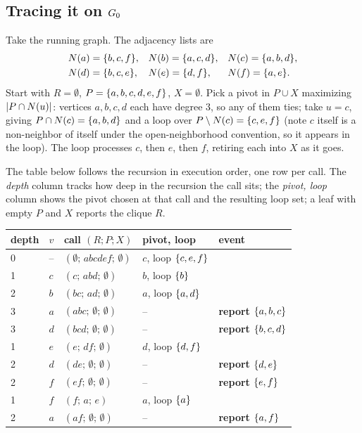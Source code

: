 \subsection{Tracing it on $G_0$}
\label{ch29:bk-trace}

Take the running graph. The adjacency lists are
\[
\begin{aligned}
&N(a)=\{b,c,f\}, &&N(b)=\{a,c,d\}, &&N(c)=\{a,b,d\},\\
&N(d)=\{b,c,e\}, &&N(e)=\{d,f\},   &&N(f)=\{a,e\}.
\end{aligned}
\]
Start with $R=\emptyset$, $P=\{a,b,c,d,e,f\}$, $X=\emptyset$. Pick a pivot in
$P\cup X$ maximizing $\lvert P\cap N(u)\rvert$: vertices $a,b,c,d$ each have degree $3$,
so any of them ties; take $u=c$, giving $P\cap N(c)=\{a,b,d\}$ and a loop over
$P\setminus N(c)=\{c,e,f\}$ (note $c$ itself is a non-neighbor of itself under
the open-neighborhood convention, so it appears in the loop). The loop processes
$c$, then $e$, then $f$, retiring each into $X$ as it goes.

The table below follows the recursion in execution order, one row per call. The
\emph{depth} column tracks how deep in the recursion the call sits; the
\emph{pivot, loop} column shows the pivot chosen at that call and the resulting
loop set; a leaf with empty $P$ and $X$ reports the clique $R$.

\begin{center}
\renewcommand{\arraystretch}{1.25}
\begin{tabular}{@{}lllll@{}}
\toprule
depth & $v$ & call $(R;P;X)$ & pivot, loop & event \\
\midrule
0 & --   & $(\emptyset;\,abcdef;\,\emptyset)$ & $c$, loop $\{c,e,f\}$ & \\
1 & $c$  & $(c;\,abd;\,\emptyset)$            & $b$, loop $\{b\}$     & \\
2 & $b$  & $(bc;\,ad;\,\emptyset)$            & $a$, loop $\{a,d\}$   & \\
3 & $a$  & $(abc;\,\emptyset;\,\emptyset)$    & --                      & \textbf{report }$\{a,b,c\}$\\
3 & $d$  & $(bcd;\,\emptyset;\,\emptyset)$    & --                      & \textbf{report }$\{b,c,d\}$\\
1 & $e$  & $(e;\,df;\,\emptyset)$             & $d$, loop $\{d,f\}$   & \\
2 & $d$  & $(de;\,\emptyset;\,\emptyset)$     & --                      & \textbf{report }$\{d,e\}$\\
2 & $f$  & $(ef;\,\emptyset;\,\emptyset)$     & --                      & \textbf{report }$\{e,f\}$\\
1 & $f$  & $(f;\,a;\,e)$                      & $a$, loop $\{a\}$      & \\
2 & $a$  & $(af;\,\emptyset;\,\emptyset)$     & --                      & \textbf{report }$\{a,f\}$\\
\bottomrule
\end{tabular}
\end{center}

